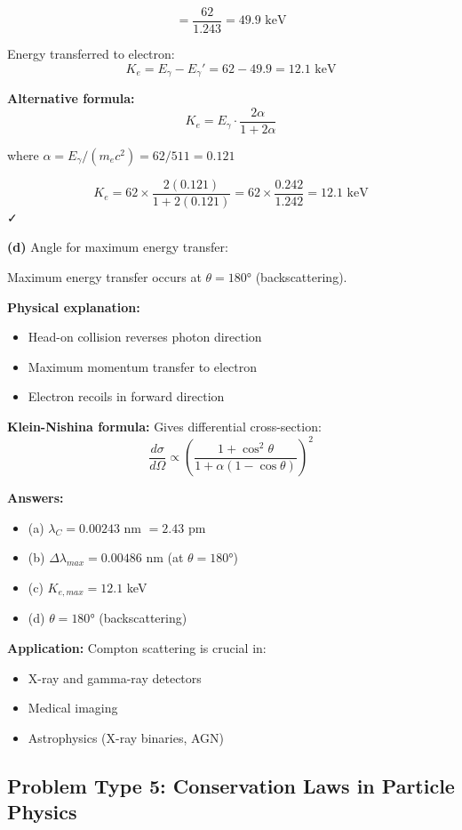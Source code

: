 \documentclass[12pt,a4paper]{article}
\begin{document}
\begin{solution}
$$= \frac{62}{1.243} = 49.9\text{ keV}$$

Energy transferred to electron:
$$K_e = E_{\gamma} - E_{\gamma}' = 62 - 49.9 = 12.1\text{ keV}$$

\textbf{Alternative formula:}
$$K_e = E_{\gamma} \cdot \frac{2\alpha}{1 + 2\alpha}$$

where $\alpha = E_{\gamma}/(m_e c^2) = 62/511 = 0.121$

$$K_e = 62 \times \frac{2(0.121)}{1 + 2(0.121)} = 62 \times \frac{0.242}{1.242} = 12.1\text{ keV}$$ ✓

\textbf{(d)} Angle for maximum energy transfer:

Maximum energy transfer occurs at \textbf{$\theta = 180°$} (backscattering).

\textbf{Physical explanation:}
\begin{itemize}
    \item Head-on collision reverses photon direction
    \item Maximum momentum transfer to electron
    \item Electron recoils in forward direction
\end{itemize}

\textbf{Klein-Nishina formula:} Gives differential cross-section:
$$\frac{d\sigma}{d\Omega} \propto \left(\frac{1 + \cos^2\theta}{1 + \alpha(1-\cos\theta)}\right)^2$$

\textbf{Answers:}
\begin{itemize}
    \item (a) $\lambda_C = 0.00243$ nm $= 2.43$ pm
    \item (b) $\Delta\lambda_{max} = 0.00486$ nm (at $\theta = 180°$)
    \item (c) $K_{e,max} = 12.1$ keV
    \item (d) $\theta = 180°$ (backscattering)
\end{itemize}

\textbf{Application:} Compton scattering is crucial in:
\begin{itemize}
    \item X-ray and gamma-ray detectors
    \item Medical imaging
    \item Astrophysics (X-ray binaries, AGN)
\end{itemize}
\end{solution}

\subsection{Problem Type 5: Conservation Laws in Particle Physics}
\end{document}
